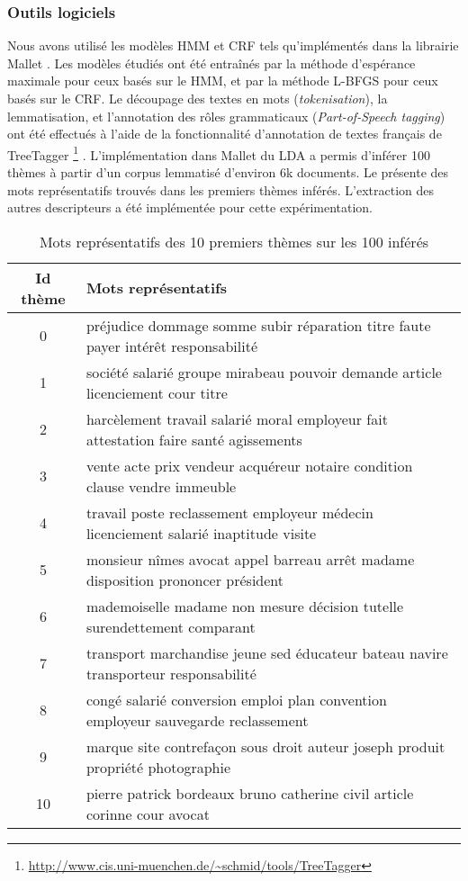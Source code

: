 \subsubsection{Outils logiciels}
Nous avons utilisé les modèles HMM et CRF tels qu'implémentés dans la librairie Mallet \citep{McCallum2012Mallet}. Les modèles étudiés ont été entraînés par la méthode d'espérance maximale pour ceux basés sur le HMM, et par la méthode L-BFGS pour ceux basés sur le CRF. Le découpage des textes en mots (\textit{tokenisation}), la lemmatisation, et l'annotation des rôles grammaticaux (\textit{Part-of-Speech tagging}) ont été effectués à l'aide de la fonctionnalité d'annotation de textes français de TreeTagger \footnote{\url{http://www.cis.uni-muenchen.de/~schmid/tools/TreeTagger}}  \citep{schmid1994treetagger}. L'implémentation dans Mallet du LDA \citep{blei2003lda} a permis d'inférer 100 thèmes à partir d'un corpus lemmatisé d'environ 6k documents. Le  
présente des mots représentatifs trouvés dans les premiers thèmes inférés. L'extraction des autres descripteurs a été implémentée pour cette expérimentation. 


\begin{table}[!ht]
\scriptsize
\begin{center}
\begin{tabular}{c|l}
Id thème & Mots représentatifs  \\ \hline
0	& 	préjudice  dommage  somme  subir  réparation  titre  faute  payer  intérêt  responsabilité  \\ \hline
1	& société  salarié  groupe  mirabeau  pouvoir  demande  article  licenciement  cour  titre    \\ \hline
2	& harcèlement  travail  salarié  moral  employeur  fait  attestation  faire  santé  agissements  \\ \hline
3	& vente  acte  prix  vendeur  acquéreur  notaire  condition  clause  vendre  immeuble  \\ \hline
4	& 		travail  poste  reclassement  employeur  médecin  licenciement  salarié  inaptitude  visite  \\ \hline
5	& 	monsieur  nîmes  avocat  appel  barreau  arrêt  madame  disposition  prononcer  président  \\ \hline
6	& 	mademoiselle  madame  non  mesure  décision  tutelle  surendettement  comparant   \\ \hline
7	& transport  marchandise  jeune  sed  éducateur  bateau  navire  transporteur  responsabilité  \\ \hline
8	&congé  salarié  conversion  emploi  plan  convention  employeur  sauvegarde  reclassement  \\ \hline
9	&marque  site  contrefaçon  sous  droit  auteur  joseph  produit  propriété  photographie  \\ \hline
10	&pierre  patrick  bordeaux  bruno  catherine  civil  article  corinne  cour  avocat\\ \hline
\end{tabular}
\end{center}
\caption{Mots représentatifs des 10 premiers thèmes sur les 100 inférés}\label{p4_topics}
\end{table}

